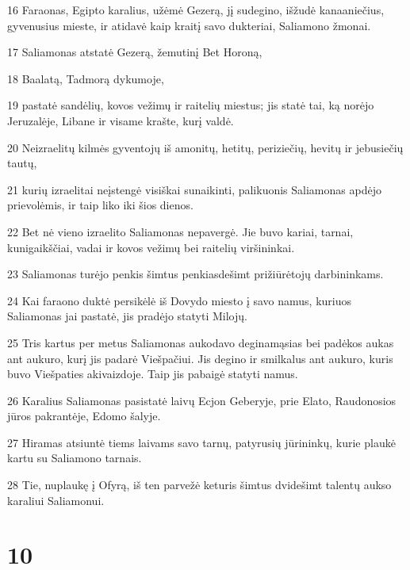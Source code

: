 \par 16 Faraonas, Egipto karalius, užėmė Gezerą, jį sudegino, išžudė kanaaniečius, gyvenusius mieste, ir atidavė kaip kraitį savo dukteriai, Saliamono žmonai. 
\par 17 Saliamonas atstatė Gezerą, žemutinį Bet Horoną, 
\par 18 Baalatą, Tadmorą dykumoje, 
\par 19 pastatė sandėlių, kovos vežimų ir raitelių miestus; jis statė tai, ką norėjo Jeruzalėje, Libane ir visame krašte, kurį valdė. 
\par 20 Neizraelitų kilmės gyventojų iš amonitų, hetitų, periziečių, hevitų ir jebusiečių tautų, 
\par 21 kurių izraelitai neįstengė visiškai sunaikinti, palikuonis Saliamonas apdėjo prievolėmis, ir taip liko iki šios dienos. 
\par 22 Bet nė vieno izraelito Saliamonas nepavergė. Jie buvo kariai, tarnai, kunigaikščiai, vadai ir kovos vežimų bei raitelių viršininkai. 
\par 23 Saliamonas turėjo penkis šimtus penkiasdešimt prižiūrėtojų darbininkams. 
\par 24 Kai faraono duktė persikėlė iš Dovydo miesto į savo namus, kuriuos Saliamonas jai pastatė, jis pradėjo statyti Milojų. 
\par 25 Tris kartus per metus Saliamonas aukodavo deginamąsias bei padėkos aukas ant aukuro, kurį jis padarė Viešpačiui. Jis degino ir smilkalus ant aukuro, kuris buvo Viešpaties akivaizdoje. Taip jis pabaigė statyti namus. 
\par 26 Karalius Saliamonas pasistatė laivų Ecjon Geberyje, prie Elato, Raudonosios jūros pakrantėje, Edomo šalyje. 
\par 27 Hiramas atsiuntė tiems laivams savo tarnų, patyrusių jūrininkų, kurie plaukė kartu su Saliamono tarnais. 
\par 28 Tie, nuplaukę į Ofyrą, iš ten parvežė keturis šimtus dvidešimt talentų aukso karaliui Saliamonui.



\chapter{10}

